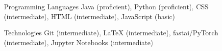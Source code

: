 


\begin{cvskills}


\cvskill
{Programming Languages} %
{Java (proficient), Python (proficient), CSS (intermediate), HTML (intermediate), JavaScript (basic)} %



\cvskill
{Technologies} %
{Git (intermediate), \textrm{\LaTeX} (intermediate),
fastai/PyTorch (intermediate), Jupyter Notebooks (intermediate)} %





\end{cvskills}